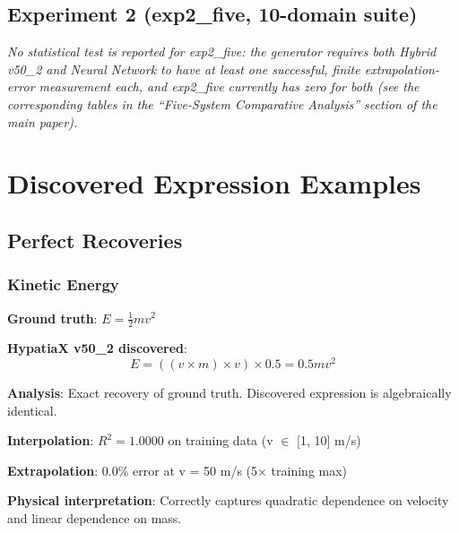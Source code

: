 \documentclass[twoside,11pt]{article}
\begin{document}

\subsection*{Experiment 2 (exp2\_five, 10-domain suite)}

\textit{No statistical test is reported for exp2\_five: the generator requires both Hybrid v50\_2 and Neural Network to have at least one successful, finite extrapolation-error measurement each, and exp2\_five currently has zero for both (see the corresponding tables in the ``Five-System Comparative Analysis'' section of the main paper).}

\clearpage


\section{Discovered Expression Examples}
\label{app:expressions}

\subsection{Perfect Recoveries}

\subsubsection{Kinetic Energy}

\begin{example}
\textbf{Ground truth}: $E = \frac{1}{2}mv^2$

\textbf{HypatiaX v50\_2 discovered}:
\begin{equation}
E = ((v \times m) \times v) \times 0.5 = 0.5mv^2
\end{equation}

\textbf{Analysis}: Exact recovery of ground truth. Discovered expression is algebraically identical.

\textbf{Interpolation}: $R^2 = 1.0000$ on training data (v $\in$ [1, 10] m/s)

\textbf{Extrapolation}: 0.0\% error at v = 50 m/s (5$\times$ training max)

\textbf{Physical interpretation}: Correctly captures quadratic dependence on velocity and linear dependence on mass.
\end{example}
\end{document}
